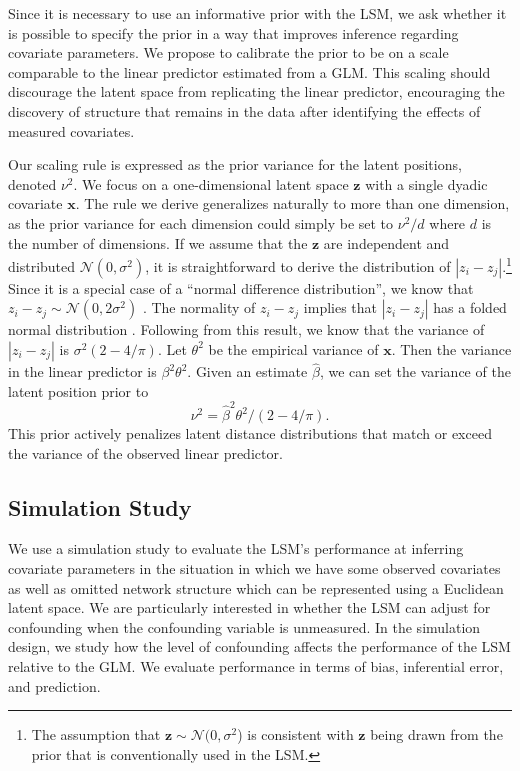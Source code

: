 \documentclass[11pt]{article}
\begin{document}
Since it is necessary to use an informative prior with the LSM, we ask whether it is possible to specify the prior in a way that improves inference regarding covariate parameters. We propose to calibrate the prior to be on a scale comparable to the linear predictor estimated from a GLM. This scaling should discourage the latent space from replicating the linear predictor, encouraging the discovery of structure that remains in the data after identifying the effects of measured covariates.  

Our scaling rule is expressed as the prior variance for the latent positions, denoted $\nu^2$. We focus on a one-dimensional latent space $\mathbf{z}$ with a single dyadic covariate $\mathbf{x}$. The rule we derive generalizes naturally to more than one dimension, as the prior variance for each dimension could simply be set to $\nu^2/d$ where $d$ is the number of dimensions.  If we assume that the $\mathbf{z}$ are independent and distributed $\mathcal{N}(0,\sigma^2)$, it is straightforward to derive the distribution of $|z_i - z_j|$.\footnote{The assumption that $\mathbf{z} \sim \mathcal{N}(0,\sigma^2$) is consistent with $\mathbf{z}$ being drawn from the prior that is conventionally used in the LSM.} Since it is a special case of a ``normal difference distribution'', we know that $z_i - z_j \sim \mathcal{N}(0,2\sigma^2)$ \citep{devore2012}. The normality of $z_i - z_j$ implies that $|z_i - z_j|$ has a folded normal distribution \citep{leone1961}. Following from this result, we know that the variance of  $|z_i - z_j|$ is $\sigma^2(2-4/\pi)$.  Let $\theta^2$ be the empirical variance of $\mathbf{x}$. Then the variance in the linear predictor is $\beta^2\theta^2$. Given an estimate $\hat{\beta}$, we can set the variance of the latent position prior to $$\nu^2=\hat{\beta}^2\theta^2/(2-4/\pi).$$  This prior actively penalizes latent distance distributions that match or exceed the variance of the observed linear predictor. 
\subsection{Simulation Study}

We use a simulation study to evaluate the LSM's performance at inferring covariate parameters in the situation in which we have some observed covariates as well as omitted network structure which can be represented using a Euclidean latent space. We are particularly interested in whether the LSM can adjust for confounding when the confounding variable is unmeasured. In the simulation design, we study how the level of confounding affects the performance of the LSM relative to the GLM. We evaluate performance in terms of bias, inferential error, and prediction. 
\end{document}
